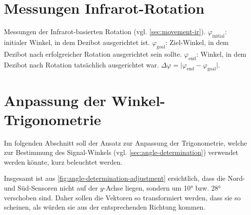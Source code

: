 \section{Messungen Infrarot-Rotation}
\label{sec:measurements-ir-rotation}

\begin{table}[h!]
    \centering
    
    \caption{Messungen der Infrarot-basierten Rotation (vgl. \autoref{sec:movement-ir}). $\varphi_{\text{initial}}$: initialer Winkel, in dem Dezibot ausgerichtet ist. $\varphi_{\text{goal}}$: Ziel-Winkel, in dem Dezibot nach erfolgreicher Rotation ausgerichtet sein sollte. $\varphi_{\text{end}}$: Winkel, in dem Dezibot nach Rotation tatsächlich ausgerichtet war. $\Delta\varphi = \vert\varphi_{\text{end}}-\varphi_{\text{goal}}\vert$.}
    \label{tab:measurements-ir-rotation}
\end{table}


\section{Anpassung der Winkel-Trigonometrie}
\label{sec:angle-determination-adjustment}

Im folgenden Abschnitt soll der Ansatz zur Anpassung der Trigonometrie, welche zur Bestimmung des Signal\hyphen Winkels (vgl. \autoref{sec:angle-determination}) verwendet werden könnte, kurz beleuchtet werden.

Insgesamt ist aus \autoref{fig:angle-determination-adjustment} ersichtlich, dass die Nord- und Süd\hyphen Sensoren nicht auf der $y$-Achse liegen, sondern um 10° bzw. 28° verschoben sind. Daher sollen die Vektoren so transformiert werden, dass sie so scheinen, als würden sie aus der entsprechenden Richtung kommen.

